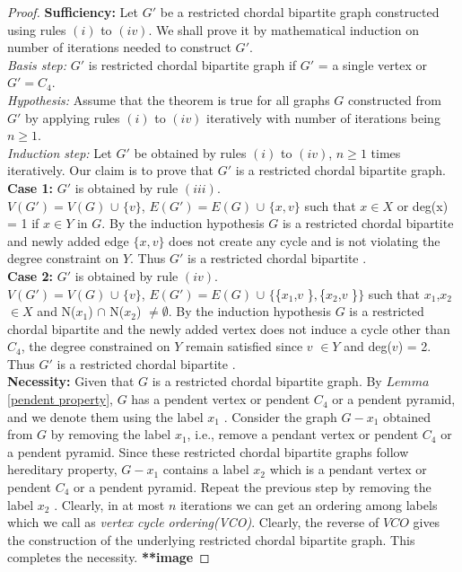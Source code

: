 \documentclass[11pt]{article}
\begin{document}
	\begin{proof}
	\textbf{Sufficiency:} Let $G'$ be a restricted chordal bipartite graph constructed using rules $(i)$ to $(iv)$. We shall prove it by mathematical induction on number of iterations needed to construct $G'$.\medskip \\
%	
	\textit{Basis step:} $G'$ is restricted chordal bipartite graph if $G'$ = a single vertex or $G'=C_4$. \medskip \\	
%
	\textit{Hypothesis:} Assume that the theorem is true for all graphs $G$ constructed from $G'$ by applying rules $(i)$ to $(iv)$ iteratively with number of iterations being $n \geq 1$.\medskip \\
%	
	\textit{Induction step:} Let $G'$ be obtained by rules $(i)$ to $(iv)$, $n \geq 1$ times iteratively. Our claim is to prove that $G'$ is a restricted chordal bipartite graph. \\
	\textbf{Case 1:} $G'$ is obtained by rule $(iii)$. \\
	$ V(G') = V(G) $ $\cup$ $\lbrace v \rbrace$, $ E(G') = E(G) $ $\cup$ $\lbrace x,v \rbrace$ such that $x \in X$ or deg(x) = 1 if $x \in Y $ in $ G $. By the induction hypothesis $G$ is a restricted chordal bipartite and newly added edge $\lbrace x,v \rbrace$ does not create any cycle and is not violating the degree constraint on $Y$. Thus $G'$ is a restricted chordal bipartite \medskip. \\
%	
%	
	\textbf{Case 2:}  $G'$ is obtained by rule $(iv)$. \\
	$ V(G') = V(G) $ $\cup$ $\lbrace v \rbrace$, $ E(G') = E(G) $ $\cup$ $\Big\{ $\big\{$x_{1}$,$v$ \big\}$, $\big\{$x_{2}$,$v$ \big\}$ \Big\}$ such that $ x_{1}$,$x_{2}$ $\in X$ and N($x_{1}$) $\cap$ N($x_{2}$) $\neq \emptyset$. By the induction hypothesis $G$ is a restricted chordal bipartite and the newly added vertex does not induce a cycle other than $C_4$, the degree constrained on $Y$ remain satisfied since $v$ $\in Y $ and deg($v$) = 2. Thus $G'$ is a restricted chordal bipartite \bigskip. \\
%	
%	
	\textbf{Necessity:} Given that $G$ is a restricted chordal bipartite graph. By $Lemma$ \ref{pendent property}, $G$ has a pendent vertex or pendent $C_4$ or a pendent pyramid, and we denote them using the label $x_1$ . Consider the graph $G - x_1$ obtained from $G$ by removing the label $x_1$, i.e., remove a pendant vertex or pendent $C_4$ or a pendent pyramid. Since these restricted chordal bipartite graphs follow hereditary property, $G - x_1 $ contains a label $x_2$ which is a pendant vertex or pendent $C_4$ or a pendent pyramid. Repeat the previous step by removing the label $x_2$ . Clearly, in at most $n$ iterations we can get an ordering among labels which we call as \textit{vertex cycle ordering(VCO)}. Clearly, the reverse of $VCO$ gives the construction of the underlying restricted chordal bipartite graph. This completes the necessity. \textbf{**image}

	\end{proof}
\end{document}
